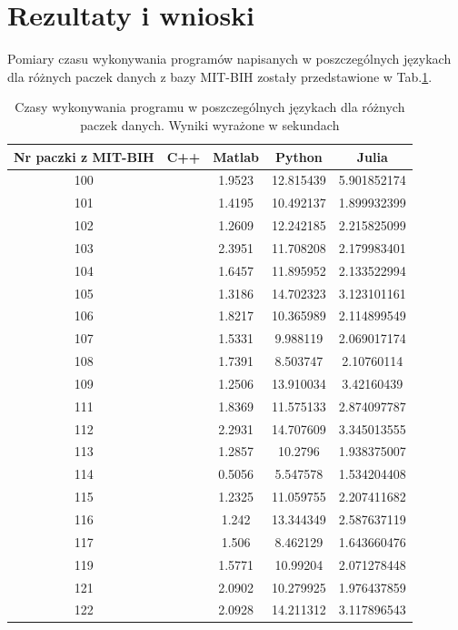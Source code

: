 \section{Rezultaty i wnioski}


Pomiary czasu wykonywania programów napisanych w poszczególnych językach dla różnych paczek danych z bazy MIT-BIH zostały przedstawione w Tab.\ref{tabResults}.

\begin{table}[!tp]
	\centering
	\caption{Czasy wykonywania programu w poszczególnych językach dla różnych paczek danych. Wyniki wyrażone w sekundach}
	\label{tabResults}
	\begin{tabular}{|c|c|c|c|c|}
		\hline
		Nr paczki z MIT-BIH & C++ & Matlab & Python & Julia\\ \hline		
		100 & & 1.9523 & 12.815439 & 5.901852174\\ \hline
		101 & & 1.4195 & 10.492137 & 1.899932399\\ \hline
		102 & & 1.2609 & 12.242185 & 2.215825099\\ \hline
		103 & & 2.3951 & 11.708208 & 2.179983401\\ \hline
		104 & & 1.6457 & 11.895952 & 2.133522994\\ \hline
		105 & & 1.3186 & 14.702323 & 3.123101161\\ \hline
		106 & & 1.8217 & 10.365989 & 2.114899549\\ \hline
		107 & & 1.5331 &  9.988119 & 2.069017174\\ \hline
		108 & & 1.7391 &  8.503747 & 2.10760114\\ \hline
		109 & & 1.2506 & 13.910034 & 3.42160439\\ \hline
		111 & & 1.8369 & 11.575133 & 2.874097787\\ \hline
		112 & & 2.2931 & 14.707609 & 3.345013555\\ \hline
		113 & & 1.2857 & 10.2796   & 1.938375007\\ \hline
		114 & & 0.5056 &  5.547578 & 1.534204408\\ \hline
		115 & & 1.2325 & 11.059755 & 2.207411682\\ \hline
		116 & & 1.242  & 13.344349 & 2.587637119\\ \hline
		117 & & 1.506  &  8.462129 & 1.643660476\\ \hline
		119 & & 1.5771 & 10.99204  & 2.071278448\\ \hline
		121 & & 2.0902 & 10.279925 & 1.976437859\\ \hline
		122 & & 2.0928 & 14.211312 & 3.117896543\\ \hline

\end{tabular}
\end{table}

